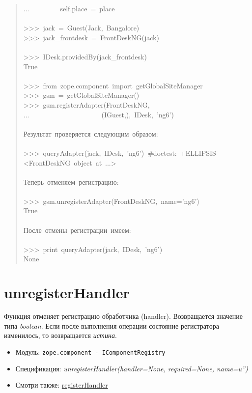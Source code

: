 \documentclass[a4paper,openany,twoside,final]{book}
\providecommand*{\DUroletitlereference}[1]{\textsl{#1}}
\begin{document}
\begin{quote}
{...~~~~~~~~~self.place~=~place\\
~\\
>{}>{}>~jack~=~Guest(\textquotedbl{}Jack\textquotedbl{},~\textquotedbl{}Bangalore\textquotedbl{})\\
>{}>{}>~jack\_frontdesk~=~FrontDeskNG(jack)\\
~\\
>{}>{}>~IDesk.providedBy(jack\_frontdesk)\\
True\\
~\\
>{}>{}>~from~zope.component~import~getGlobalSiteManager\\
>{}>{}>~gsm~=~getGlobalSiteManager()\\
>{}>{}>~gsm.registerAdapter(FrontDeskNG,\\
...~~~~~~~~~~~~~~~~~~~~~(IGuest,),~IDesk,~'ng6')\\
~\\
Результат~проверяется~следующим~образом:\\
~\\
>{}>{}>~queryAdapter(jack,~IDesk,~'ng6')~\#doctest:~+ELLIPSIS\\
<FrontDeskNG~object~at~...>\\
~\\
Теперь~отменяем~регистрацию:\\
~\\
>{}>{}>~gsm.unregisterAdapter(FrontDeskNG,~name='ng6')\\
True\\
~\\
После~отмены~регистрации~имеем:\\
~\\
>{}>{}>~print~queryAdapter(jack,~IDesk,~'ng6')\\
None
}
\end{quote}


\section*{unregisterHandler%
  \label{unregisterhandler}%
}

Функция отменяет регистрацию обработчика (handler). Возвращается
значение типа \DUroletitlereference{boolean}.  Если после выполнения операции состояние
регистратора изменилось, то возвращается \DUroletitlereference{истина}.

\begin{itemize}

\item Модуль: \texttt{zope.component - IComponentRegistry}

\item Спецификация: \DUroletitlereference{unregisterHandler(handler=None, required=None,
name=u'')}

\item Смотри также: \hyperref[registerhandler]{registerHandler}

\end{itemize}
\end{document}
